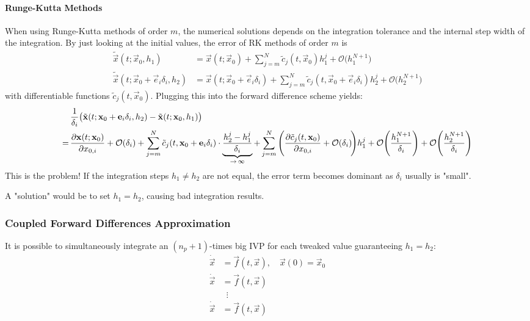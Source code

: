 				\paragraph{Runge-Kutta Methods}
					When using Runge-Kutta methods of order \(m\), the numerical solutions depends on the integration tolerance and the internal step width of the integration. By just looking at the initial values, the error of RK methods of order \(m\) is
					\begin{align*}
						\tilde{\vec{x}}(t; \vec{x}_0, h_1) &= \vec{x}(t; \vec{x}_0) + \sum_{j = m}^{N} \tilde{c}_j(t, \vec{x}_0) h_1^j + \mathcal{O}\big(h_1^{N + 1}\big) \\
						\tilde{\vec{x}}(t; \vec{x}_0 + \vec{e}_i \delta_i, h_2) &= \vec{x}(t; \vec{x}_0 + \vec{e}_i \delta_i) + \sum_{j = m}^{N} \tilde{c}_j(t, \vec{x}_0 + \vec{e}_i \delta_i) h_2^j + \mathcal{O}\big(h_2^{N + 1}\big)
					\end{align*}
					with differentiable functions \( \tilde{c}_j(t, \vec{x}_0) \). Plugging this into the forward difference scheme yields:
					\begin{align*}
						  &\, \frac{1}{\delta_i} \big( \tilde{\boldsymbol{\mathrm{x}}}(t; \boldsymbol{\mathrm{x}}_0 + \boldsymbol{\mathrm{e}}_i \delta_i, h_2) - \tilde{\boldsymbol{\mathrm{x}}}(t; \boldsymbol{\mathrm{x}}_0, h_1) \big) \\
						= &\, \pdv{\boldsymbol{\mathrm{x}}(t; \boldsymbol{\mathrm{x}}_0)}{x_{0, i}} + \mathcal{O}(\delta_i) + \sum_{j = m}^{N} \tilde{c}_j(t, \boldsymbol{\mathrm{x}}_0 + \boldsymbol{\mathrm{e}}_i \delta_i) \cdot \underbrace{\frac{h_2^j - h_1^j}{\delta_i}}_{\to\,\infty} + \sum_{j = m}^{N} \Bigg( \pdv{\tilde{c}_j(t, \boldsymbol{\mathrm{x}}_0)}{x_{0, i}} + \mathcal{O}(\delta_i) \!\Bigg) h_1^j + \mathcal{O}\Bigg( \frac{h_1^{N + 1}}{\delta_i} \Bigg) + \mathcal{O}\Bigg( \frac{h_2^{N + 1}}{\delta_i} \Bigg)
					\end{align*}
					This is the problem! If the integration steps \( h_1 \neq h_2 \) are not equal, the error term becomes dominant as \( \delta_i \) usually is "small".
					
					A "solution" would be to set \( h_1 = h_2 \), causing bad integration results.

			\subsubsection{Coupled Forward Differences Approximation}
				It is possible to simultaneously integrate an \( (n_p + 1) \)-times big IVP for each tweaked value guaranteeing \( h_1 = h_2 \):
				\begin{align*}
					\dot{\vec{x}} &= \vec{f}(t, \vec{x}),\quad \vec{x}(0) = \vec{x}_0 \\
					\dot{\vec{x}} &= \vec{f}(t, \vec{x}) \\
					&\,\,\,\vdots \\
					\dot{\vec{x}} &= \vec{f}(t, \vec{x})
				\end{align*}

